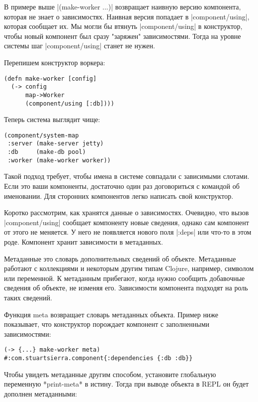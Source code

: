 В примере выше \spverb|(make-worker {...})| возвращает наивную версию компонента,
которая не знает о зависимостях. Наивная версия попадает в \spverb|component/using|,
которая сообщает их. Мы могли бы втянуть \spverb|component/using| в конструктор, чтобы
новый компонент был сразу "заряжен" зависимостями. Тогда на уровне системы шаг
\spverb|component/using| станет не нужен.

Перепишем конструктор воркера:

\begin{verbatim}
(defn make-worker [config]
  (-> config
      map->Worker
      (component/using [:db])))
\end{verbatim}

Теперь система выглядит чище:

\begin{verbatim}
(component/system-map
 :server (make-server jetty)
 :db     (make-db pool)
 :worker (make-worker worker))
\end{verbatim}

Такой подход требует, чтобы имена в системе совпадали с зависимыми слотами. Если
это ваши компоненты, достаточно один раз договориться с командой об
именовании. Для сторонних компонентов легко написать свой конструктор.

Коротко рассмотрим, как хранятся данные о зависимостях. Очевидно, что вызов
\spverb|component/using| сообщает компоненту новые сведения, однако сам компонент от
этого не меняется. У него не появляется нового поля \spverb|:deps| или что-то в этом
роде. Компонент хранит зависимости в метаданных.

Метаданные это словарь дополнительных сведений об объекте. Метаданные работают с
коллекциями и некоторым другим типам Clojure, например, символом или
переменной. К метаданным прибегают, когда нужно сообщить добавочные сведения об
объекте, не изменяя его. Зависимости компонента подходят на роль таких сведений.

Функция meta возвращает словарь метаданных объекта. Пример ниже показывает, что
конструктор порождает компонент с заполненными зависимостями:

\begin{verbatim}
(-> {...} make-worker meta)
#:com.stuartsierra.component{:dependencies {:db :db}}
\end{verbatim}

Чтобы увидеть метаданные другим способом, установите глобальную переменную
*print-meta* в истину. Тогда при выводе объекта в REPL он будет дополнен
метаданными:


